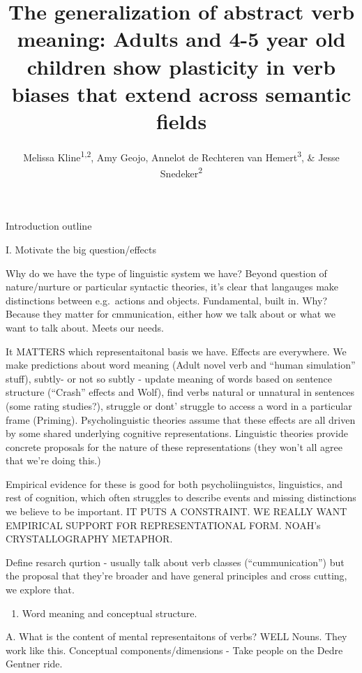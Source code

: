 \documentclass[english,man]{apa6}
\title{The generalization of abstract verb meaning: Adults and 4-5 year old
children show plasticity in verb biases that extend across semantic
fields}
\author{Melissa Kline\textsuperscript{1,2}, Amy Geojo, Annelot de Rechteren van Hemert\textsuperscript{3}, \& Jesse Snedeker\textsuperscript{2}}
\affiliation{
    \vspace{0.5cm}
          \textsuperscript{1} Massachusetts Institute of Technology\\
          \textsuperscript{2} Harvard University\\
          \textsuperscript{3} TODO: Annelot's current institution  }
\providecommand{\tightlist}{%
  \setlength{\itemsep}{0pt}\setlength{\parskip}{0pt}}
\theoremstyle{definition}
\theoremstyle{definition}
\theoremstyle{remark}
\begin{document}
\maketitle

\setcounter{secnumdepth}{0}



Introduction outline

I. Motivate the big question/effects

Why do we have the type of linguistic system we have? Beyond question of
nature/nurture or particular syntactic theories, it's clear that
langauges make distinctions between e.g.~actions and objects.
Fundamental, built in. Why? Because they matter for cmmunication, either
how we talk about or what we want to talk about. Meets our needs.

It MATTERS which representaitonal basis we have. Effects are everywhere.
We make predictions about word meaning (Adult novel verb and
\enquote{human simulation} stuff), subtly- or not so subtly - update
meaning of words based on sentence structure (\enquote{Crash} effects
and Wolf), find verbs natural or unnatural in sentences (some rating
studies?), struggle or dont' struggle to access a word in a particular
frame (Priming). Psycholinguistic theories assume that these effects are
all driven by some shared underlying cognitive representations.
Linguistic theories provide concrete proposals for the nature of these
representations (they won't all agree that we're doing this.)

Empirical evidence for these is good for both psycholiinguistcs,
linguistics, and rest of cognition, which often struggles to describe
events and missing distinctions we believe to be important. IT PUTS A
CONSTRAINT. WE REALLY WANT EMPIRICAL SUPPORT FOR REPRESENTATIONAL FORM.
NOAH's CRYSTALLOGRAPHY METAPHOR.

Define resarch qurtion - usually talk about verb classes
(\enquote{cummunication}) but the proposal that they're broader and have
general principles and cross cutting, we explore that.

\begin{enumerate}
\def\labelenumi{\Roman{enumi}.}
\setcounter{enumi}{1}
\tightlist
\item
  Word meaning and conceptual structure.
\end{enumerate}

A. What is the content of mental representaitons of verbs? WELL Nouns.
They work like this. Conceptual components/dimensions - Take people on
the Dedre Gentner ride.
\end{document}

